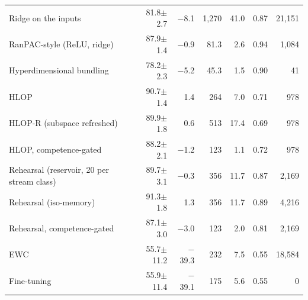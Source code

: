 \begin{tabular*}{\textwidth}{@{\extracolsep{\fill}}lrrrrrr@{}}
Ridge on the inputs & 81.8$\pm$2.7 & \ensuremath{-}8.1 & 1,270 & 41.0 & 0.87 & 21,151 \\
RanPAC-style (ReLU, ridge) & 87.9$\pm$1.4 & \ensuremath{-}0.9 & 81.3 & 2.6 & 0.94 & 1,084 \\
Hyperdimensional bundling & 78.2$\pm$2.3 & \ensuremath{-}5.2 & 45.3 & 1.5 & 0.90 & 41 \\
HLOP & 90.7$\pm$1.4 & 1.4 & 264 & 7.0 & 0.71 & 978 \\
HLOP-R (subspace refreshed) & 89.9$\pm$1.8 & 0.6 & 513 & 17.4 & 0.69 & 978 \\
HLOP, competence-gated & 88.2$\pm$2.1 & \ensuremath{-}1.2 & 123 & 1.1 & 0.72 & 978 \\
Rehearsal (reservoir, 20 per stream class) & 89.7$\pm$3.1 & \ensuremath{-}0.3 & 356 & 11.7 & 0.87 & 2,169 \\
Rehearsal (iso-memory) & 91.3$\pm$1.8 & 1.3 & 356 & 11.7 & 0.89 & 4,216 \\
Rehearsal, competence-gated & 87.1$\pm$3.0 & \ensuremath{-}3.0 & 123 & 2.0 & 0.81 & 2,169 \\
EWC & 55.7$\pm$11.2 & \ensuremath{-}39.3 & 232 & 7.5 & 0.55 & 18,584 \\
Fine-tuning & 55.9$\pm$11.4 & \ensuremath{-}39.1 & 175 & 5.6 & 0.55 & 0 \\
\bottomrule
\end{tabular*}

